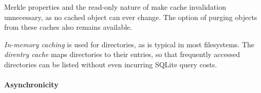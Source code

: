 Merkle properties and the read-only nature of \SWHFS{} make cache invalidation
unnecessary, as no cached object can ever change. The option of purging objects
from these caches also remains available.

\emph{In-memory caching} is used for directories, as is typical in most
filesystems. The \emph{direntry cache} maps directories to their entries, so
that frequently accessed directories can be listed without even incurring
SQLite query costs.


%
% 
% 
% 


\paragraph*{Asynchronicity}

